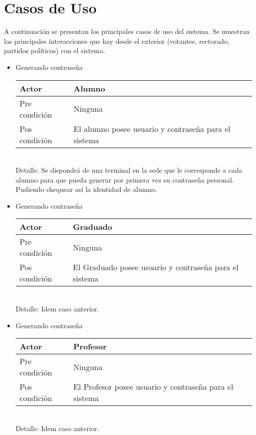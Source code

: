 \section{Casos de Uso}

A continuaci\'on se presentan los principales casos de uso del sistema.
Se muestran las principales interacciones que hay desde el exterior (votantes, rectorado, partidos pol\'iticos) con el sistema.


\begin{itemize}
\bigskip
\item Generando contraseña
\bigskip
\begin{center}
\begin{tabular}{ll}
Actor & Alumno \\
\hline
Pre condición & Ninguna \\
\hline
Pos condición & El alumno posee usuario y contraseña para el sistema\\
\hline
\end{tabular}
\medskip
\\
Detalle: Se dispondrá de una terminal en la sede que le corresponde a cada alumno para que pueda generar por primera vez su contraseña personal. Pudiendo chequear así la identidad de alumno.
\end{center}

\bigskip
\item Generando contraseña
\bigskip
\begin{center}
\begin{tabular}{ll}
Actor & Graduado \\
\hline
Pre condición & Ninguna \\
\hline
Pos condición & El Graduado posee usuario y contraseña para el sistema\\
\hline
\end{tabular}
\medskip
\\
Detalle: Idem caso anterior.
\end{center}

\bigskip
\item Generando contraseña
\bigskip
\begin{center}
\begin{tabular}{ll}
Actor & Profesor \\
\hline
Pre condición & Ninguna \\
\hline
Pos condición & El Profesor posee usuario y contraseña para el sistema\\
\hline
\end{tabular}
\medskip
\\
Detalle: Idem caso anterior.
\end{center}


\end{itemize}
